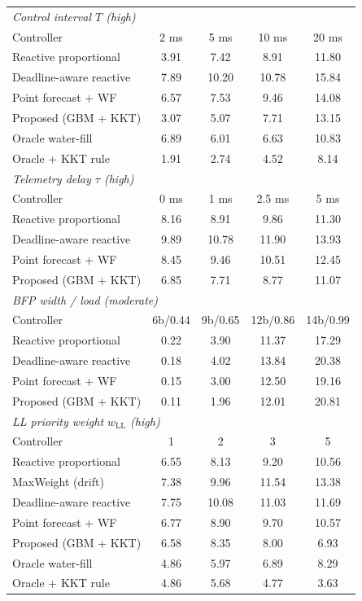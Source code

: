 \begin{tabular}{lcccc}
\hline
\multicolumn{5}{l}{\textit{Control interval $T$ (high)}} \\
Controller & 2 ms & 5 ms & 10 ms & 20 ms \\
\hline
Reactive proportional & 3.91 & 7.42 & 8.91 & 11.80 \\
Deadline-aware reactive & 7.89 & 10.20 & 10.78 & 15.84 \\
Point forecast + WF & 6.57 & 7.53 & 9.46 & 14.08 \\
Proposed (GBM + KKT) & 3.07 & 5.07 & 7.71 & 13.15 \\
Oracle water-fill & 6.89 & 6.01 & 6.63 & 10.83 \\
Oracle + KKT rule & 1.91 & 2.74 & 4.52 & 8.14 \\
\hline
\multicolumn{5}{l}{\textit{Telemetry delay $\tau$ (high)}} \\
Controller & 0 ms & 1 ms & 2.5 ms & 5 ms \\
\hline
Reactive proportional & 8.16 & 8.91 & 9.86 & 11.30 \\
Deadline-aware reactive & 9.89 & 10.78 & 11.90 & 13.93 \\
Point forecast + WF & 8.45 & 9.46 & 10.51 & 12.45 \\
Proposed (GBM + KKT) & 6.85 & 7.71 & 8.77 & 11.07 \\
\hline
\multicolumn{5}{l}{\textit{BFP width / load (moderate)}} \\
Controller & 6b/0.44 & 9b/0.65 & 12b/0.86 & 14b/0.99 \\
\hline
Reactive proportional & 0.22 & 3.90 & 11.37 & 17.29 \\
Deadline-aware reactive & 0.18 & 4.02 & 13.84 & 20.38 \\
Point forecast + WF & 0.15 & 3.00 & 12.50 & 19.16 \\
Proposed (GBM + KKT) & 0.11 & 1.96 & 12.01 & 20.81 \\
\hline
\multicolumn{5}{l}{\textit{LL priority weight $w_{\mathrm{LL}}$ (high)}} \\
Controller & 1 & 2 & 3 & 5 \\
\hline
Reactive proportional & 6.55 & 8.13 & 9.20 & 10.56 \\
MaxWeight (drift) & 7.38 & 9.96 & 11.54 & 13.38 \\
Deadline-aware reactive & 7.75 & 10.08 & 11.03 & 11.69 \\
Point forecast + WF & 6.77 & 8.90 & 9.70 & 10.57 \\
Proposed (GBM + KKT) & 6.58 & 8.35 & 8.00 & 6.93 \\
Oracle water-fill & 4.86 & 5.97 & 6.89 & 8.29 \\
Oracle + KKT rule & 4.86 & 5.68 & 4.77 & 3.63 \\
\hline
\end{tabular}
